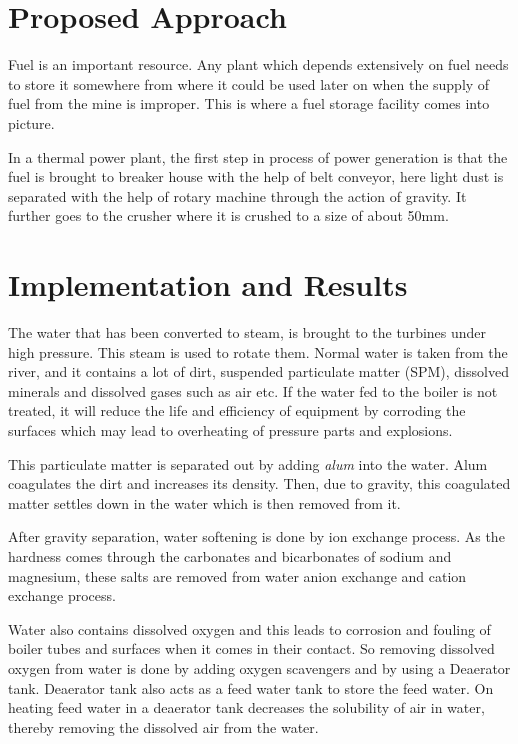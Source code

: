 \documentclass[12pt]{report}
\begin{document}
\section{Proposed Approach}
Fuel is an important resource. Any plant which depends extensively on fuel needs to store it somewhere from where it could be used later on when the supply of fuel from the mine is improper. This is where a fuel storage facility comes into picture. \par In a thermal power plant, the first step in process of power generation is that the fuel is brought to breaker house with the help of belt conveyor, here light dust is separated with the help of rotary machine through the action of gravity. It further goes to the crusher where it is crushed to a size of about 50mm.
\section{Implementation and Results}
The water that has been converted to steam, is brought to the turbines under high pressure. This steam is used to rotate them. Normal water is taken from the river, and it contains a lot of dirt, suspended particulate matter (SPM), dissolved minerals and dissolved gases such as air etc. If the water fed to the boiler is not treated, it will reduce the life and efficiency of equipment by corroding the surfaces which may lead to overheating of pressure parts and explosions. \par This particulate matter is separated out by adding {\it alum} into the water. Alum coagulates the dirt and increases its density. Then, due to gravity, this coagulated matter settles down in the water which is then removed from it. 


\par After gravity separation, water softening is done by ion exchange process. As the hardness comes through the carbonates and bicarbonates of sodium and magnesium, these salts are removed from water anion exchange and cation exchange process. \par Water also contains dissolved oxygen and this leads to corrosion and fouling of boiler tubes and surfaces when it comes in their contact. So removing dissolved oxygen from water is done by adding oxygen scavengers and by using a Deaerator tank. Deaerator tank also acts as a feed water tank to store the feed water. On heating feed water in a deaerator tank decreases the solubility of air in water, thereby removing the dissolved air from the water.
\end{document}
